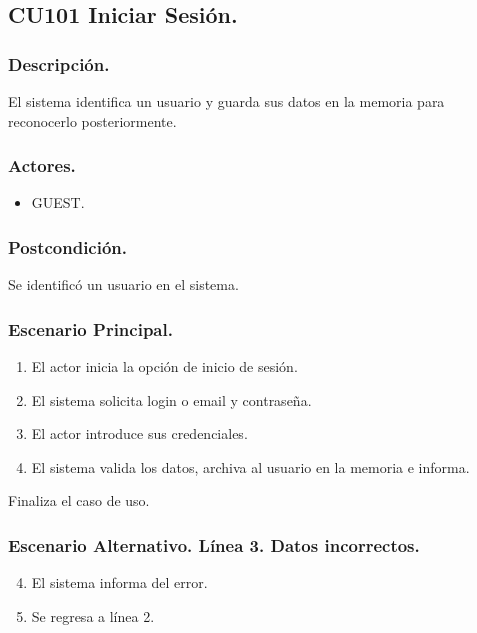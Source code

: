 \subsection{CU101 Iniciar Sesi\'{o}n.}
\subsubsection{Descripci\'{o}n.}
El sistema identifica un usuario y guarda sus datos en la memoria para reconocerlo posteriormente.
\subsubsection{Actores.}
\begin{itemize}
\item GUEST.
\end{itemize}
\subsubsection{Postcondici\'{o}n.}
Se identific\'{o} un usuario en el sistema.
\subsubsection{Escenario Principal.}
\begin{enumerate}
\item El actor inicia la opci\'{o}n de inicio de sesi\'{o}n.
\item El sistema solicita login o email y contrase\~{n}a.
\item El actor introduce sus credenciales.
\item El sistema valida los datos, archiva al usuario en la memoria e informa.
\end{enumerate}
Finaliza el caso de uso.
\subsubsection{Escenario Alternativo. L\'{i}nea 3. Datos incorrectos.}
\begin{enumerate}
\setcounter{enumi}{3}
\item El sistema informa del error.
\item Se regresa a l\'{i}nea 2.
\end{enumerate}
